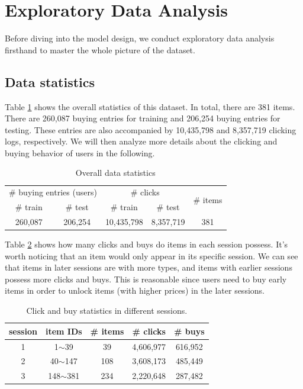 \section{Exploratory Data Analysis} \label{sec:eda}
Before diving into the model design, we conduct exploratory data analysis firsthand to master the whole picture of the dataset.

\subsection{Data statistics}
Table \ref{tab:datastats} shows the overall statistics of this dataset. 
In total, there are 381 items.
There are 260,087 buying entries for training and 206,254 buying entries for testing. These entries are also accompanied by 10,435,798 and 8,357,719 clicking logs, respectively. We will then analyze more details about the clicking and buying behavior of users in the following.

\begin{table}[t!]
    \centering
    \caption{Overall data statistics}
    \begin{tabular}{c|c|c|c|c}
        \hline
        \multicolumn{2}{c|}{\# buying entries (users)} &
        \multicolumn{2}{c|}{\# clicks} &
        \multirow{2}{*}{\# items} \\
        \cline{1-4}
          \# train & \# test & \# train & \# test & \\
        \hline
        260,087 & 206,254 & 10,435,798 & 8,357,719 & 381 \\
        \hline
        \end{tabular}
    \label{tab:datastats}
\end{table}

Table \ref{tab:clickbuysess} shows how many clicks and buys do items in each session possess. It's worth noticing that an item would only appear in its specific session.
We can see that items in later sessions are with more types, and items with earlier sessions possess more clicks and buys. This is reasonable since users need to buy early items in order to unlock items (with higher prices) in the later sessions.


\begin{table}[t!]
    \centering
    \caption{Click and buy statistics in different sessions.}
    \begin{tabular}{c|c|c|c|c} 
    \hline
    {session} & {item IDs} & {\# items} & {\# clicks} & {\# buys} \\ \hline
    {1} & {1$\sim$39}& 39 & {4,606,977} & {616,952} \\ \hline
    {2} & {40$\sim$147} & 108 & {3,608,173} & {485,449} \\ \hline
    {3} & {148$\sim$381} & 234 & {2,220,648} & {287,482} \\ \hline
    \end{tabular}
    \label{tab:clickbuysess}
\end{table}


